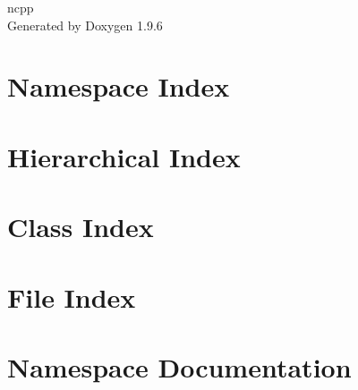\documentclass[twoside]{book}
\newcommand{\+}{\discretionary{\mbox{\scriptsize$\hookleftarrow$}}{}{}}
\newcommand{\clearemptydoublepage}{%
    \newpage{\pagestyle{empty}\cleardoublepage}%
  }
\begin{document}
  \raggedbottom
    \hypersetup{pageanchor=false,
                bookmarksnumbered=true,
                pdfencoding=unicode
               }
  \begin{titlepage}
  \vspace*{7cm}
  \begin{center}%
  {\Large ncpp}\\
  \vspace*{1cm}
  {\large Generated by Doxygen 1.9.6}\\
  \end{center}
  \end{titlepage}
  \clearemptydoublepage
  \tableofcontents
  \clearemptydoublepage
  \hypersetup{pageanchor=true}
\chapter{Namespace Index}

\chapter{Hierarchical Index}

\chapter{Class Index}

\chapter{File Index}

\chapter{Namespace Documentation}










\end{document}

